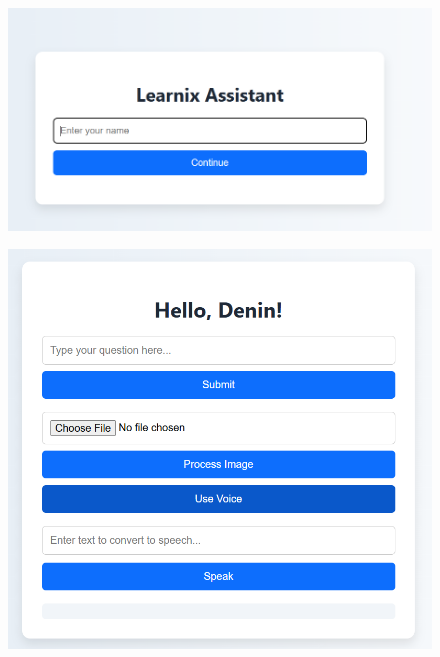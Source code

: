 \documentclass{josis}
\begin{document}
\begin{figure}[h]
  \centering
  \begin{minipage}{0.45\textwidth}
    \centering
    \includegraphics[width=\linewidth]{first.png}
    
    \label{fig:minipage1}
  \end{minipage}
  \hfill
  \begin{minipage}{0.45\textwidth}
    \centering
    \includegraphics[width=\linewidth]{second.png}
    
    \label{fig:minipage2}
  \end{minipage}

\end{figure}
\end{document}
